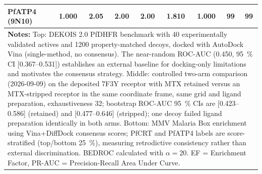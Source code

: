 \begin{table}[ht!]
\begin{tabular}{lcccccccc}
PfATP4 (9N10) & \num{1.000} & \num{2.05} & \num{2.00} & \num{2.00} & \num{1.810} & \num{1.000} & \num{99} & \num{99} \\
\bottomrule
\multicolumn{9}{p{15cm}}{
\noindent\textbf{Notes:} Top: DEKOIS 2.0 PfDHFR benchmark with \num{40} experimentally validated actives and \num{1200} property-matched decoys, docked with AutoDock Vina (single-method, no consensus). The near-random ROC-AUC (\num{0.450}, \qty{95}{\percent} CI [\numrange{0.367}{0.531}]) establishes an external baseline for docking-only limitations and motivates the consensus strategy. Middle: controlled two-arm comparison (2026-09-09) on the deposited 7F3Y receptor with MTX retained versus an MTX-stripped receptor in the same coordinate frame, same grid and ligand preparation, exhaustiveness \num{32}; bootstrap ROC-AUC \qty{95}{\percent} CIs are [\numrange{0.423}{0.586}] (retained) and [\numrange{0.477}{0.646}] (stripped); one decoy failed ligand preparation identically in both arms. Bottom: MMV Malaria Box enrichment using Vina+DiffDock consensus scores; PfCRT and PfATP4 labels are score-stratified (top/bottom \qty{25}{\percent}), measuring retrodictive consistency rather than external discrimination. BEDROC calculated with $\alpha = \num{20}$. EF = Enrichment Factor, PR-AUC = Precision-Recall Area Under Curve.}
\end{tabular}
\end{table}
